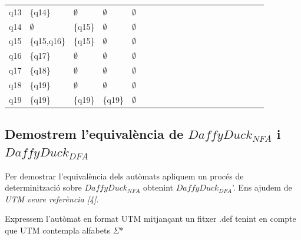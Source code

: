 \documentclass[12pt,a4paper]{report}
\def \dfa{$DaffyDuck_{DFA} $}
\def \nfa{$DaffyDuck_{NFA} $}
\begin{document}
\begin{center}
\begin{table}[ht]
\begin{tabular}{ l l l l l l l l l l l l l l l l l l l l }
q13   & \{q14\}     & $\emptyset$ & $\emptyset$            & $\emptyset$             &  &  &  &  &  &  &  &  &  &  &  &  &  &  &  \\
q14   & $\emptyset$ & \{q15\}     & $\emptyset$            & $\emptyset$             &  &  &  &  &  &  &  &  &  &  &  &  &  &  &  \\
q15   & \{q15,q16\} & \{q15\}     & $\emptyset$            & $\emptyset$             &  &  &  &  &  &  &  &  &  &  &  &  &  &  &  \\
q16   & \{q17\}     & $\emptyset$ & $\emptyset$            & $\emptyset$             &  &  &  &  &  &  &  &  &  &  &  &  &  &  &  \\
q17   & \{q18\}     & $\emptyset$ & $\emptyset$            & $\emptyset$             &  &  &  &  &  &  &  &  &  &  &  &  &  &  &  \\
q18   & \{q19\}     & $\emptyset$ & $\emptyset$            & $\emptyset$             &  &  &  &  &  &  &  &  &  &  &  &  &  &  &  \\
q19   & \{q19\}     & \{q19\}     & \{q19\}                & $\emptyset$ &  &  &  &  &  &  &  &  &  &  &  &  &  &  & \\ \hline

\end{tabular}
\end{table}

\end{center}

\subsection{Demostrem l’equivalència de \nfa{} i \dfa{}}

Per demostrar l’equivalència dels autòmats apliquem un procés de determinització sobre \nfa{} obtenint \dfa{}'. Ens ajudem de \textit{UTM veure referència [4]}.

Expressem l’autòmat en format UTM mitjançant un fitxer .def tenint en compte que UTM contempla alfabets $\Sigma$*
\end{document}
